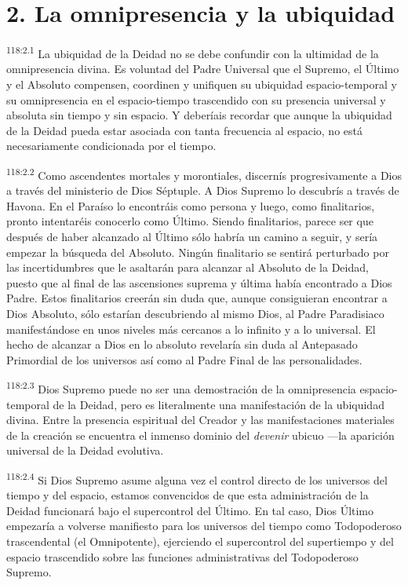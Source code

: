 \section*{2. La omnipresencia y la ubiquidad}
\par
\textsuperscript{118:2.1} La ubiquidad de la Deidad no se debe confundir con la ultimidad de la omnipresencia divina. Es voluntad del Padre Universal que el Supremo, el Último y el Absoluto compensen, coordinen y unifiquen su ubiquidad espacio-temporal y su omnipresencia en el espacio-tiempo trascendido con su presencia universal y absoluta sin tiempo y sin espacio. Y deberíais recordar que aunque la ubiquidad de la Deidad pueda estar asociada con tanta frecuencia al espacio, no está necesariamente condicionada por el tiempo.

\par
\textsuperscript{118:2.2} Como ascendentes mortales y morontiales, discernís progresivamente a Dios a través del ministerio de Dios Séptuple. A Dios Supremo lo descubrís a través de Havona. En el Paraíso lo encontráis como persona y luego, como finalitarios, pronto intentaréis conocerlo como Último. Siendo finalitarios, parece ser que después de haber alcanzado al Último sólo habría un camino a seguir, y sería empezar la búsqueda del Absoluto. Ningún finalitario se sentirá perturbado por las incertidumbres que le asaltarán para alcanzar al Absoluto de la Deidad, puesto que al final de las ascensiones suprema y última había encontrado a Dios Padre. Estos finalitarios creerán sin duda que, aunque consiguieran encontrar a Dios Absoluto, sólo estarían descubriendo al mismo Dios, al Padre Paradisiaco manifestándose en unos niveles más cercanos a lo infinito y a lo universal. El hecho de alcanzar a Dios en lo absoluto revelaría sin duda al Antepasado Primordial de los universos así como al Padre Final de las personalidades.

\par
\textsuperscript{118:2.3} Dios Supremo puede no ser una demostración de la omnipresencia espacio-temporal de la Deidad, pero es literalmente una manifestación de la ubiquidad divina. Entre la presencia espiritual del Creador y las manifestaciones materiales de la creación se encuentra el inmenso dominio del \textit{devenir} ubicuo ---la aparición universal de la Deidad evolutiva.

\par
\textsuperscript{118:2.4} Si Dios Supremo asume alguna vez el control directo de los universos del tiempo y del espacio, estamos convencidos de que esta administración de la Deidad funcionará bajo el supercontrol del Último. En tal caso, Dios Último empezaría a volverse manifiesto para los universos del tiempo como Todopoderoso trascendental (el Omnipotente), ejerciendo el supercontrol del supertiempo y del espacio trascendido sobre las funciones administrativas del Todopoderoso Supremo.

